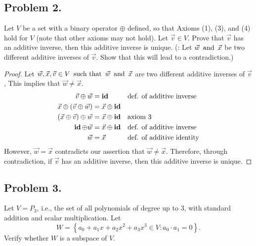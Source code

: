 \documentclass{article}
\begin{document}
\subsection*{Problem 2.}
Let $V$ be a set with a binary operator $\oplus$ defined, so that Axioms (1), (3), and (4) hold for $V$ (note that other axioms may not hold). Let $\vec{v} \in V$. Prove that  $\vec{v}$ has an additive inverse, then this additive inverse is unique. (: Let $\vec{w} \operatorname{~\text{and}~} \vec{x}$ be two different additive inverses of $\vec{v}$. Show that this will lead to a contradiction.)

\begin{proof}
    Let $\vec{w}, \vec{x}, \vec{v} \in V \operatorname{~\text{such that}~} \vec{w} \operatorname{~\text{and}~} \vec{x}$ are two different additive inverses of $\vec{v}$, This implies that $\vec{w} \neq \vec{x}$.
    \begin{align*}
        \vec{v} \oplus \vec{w}                  & = \operatorname{\textbf{id}}                &  & \text{def. of additive inverse}  \\
        \vec{x} \oplus (\vec{v} \oplus \vec{w}) & = \vec{x} \oplus \operatorname{\textbf{id}}                                       \\
        (\vec{x} \oplus \vec{v}) \oplus \vec{w} & = \vec{x} \oplus \operatorname{\textbf{id}} &  & \text{axiom 3}                   \\
        \operatorname{\textbf{id}} \oplus \vec{w}                      & = \vec{x} \oplus \operatorname{\textbf{id}} &  & \text{def. of additive inverse}  \\
        \vec{w}                                 & = \vec{x}            &  & \text{def. of additive identity}
    \end{align*}
    However, $\vec{w} = \vec{x}$ contradicts our assertion that $\vec{w} \neq \vec{x}$. Therefore, through contradiction, if $\vec{v}$ has an additive inverse, then this additive inverse is unique.
\end{proof}

\subsection*{Problem 3.}
Let $V = P_3$, i.e., the set of all polynomials of degree up to 3, with standard addition and scalar multiplication. Let
\[
    W = \left\{a_0 + a_1x + a_2x^2 + a_3x^3 \in V : a_0 \cdot a_1 = 0\right\}.
\]
Verify whether $W$ is a subspace of $V$.
\end{document}
